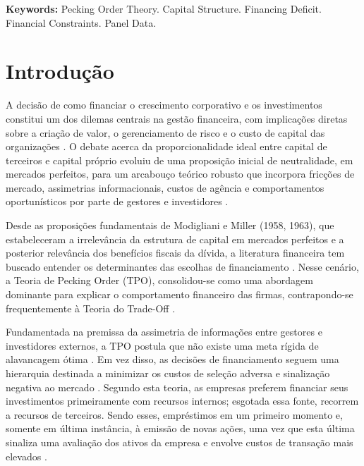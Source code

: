 \documentclass[a4paper,12pt]{article}
\begin{document}
\vspace{0.8cm}
\noindent
\textbf{Keywords:} Pecking Order Theory. Capital Structure. Financing Deficit. Financial Constraints. Panel Data.

\newpage
\tableofcontents

\newpage
\section{Introdução}

A decisão de como financiar o crescimento corporativo e os investimentos constitui um dos dilemas centrais na gestão financeira, com implicações diretas sobre a criação de valor, o gerenciamento de risco e o custo de capital das organizações \cite{AssafNeto2014,Damodaran2014}. O debate acerca da proporcionalidade ideal entre capital de terceiros e capital próprio evoluiu de uma proposição inicial de neutralidade, em mercados perfeitos, para um arcabouço teórico robusto que incorpora fricções de mercado, assimetrias informacionais, custos de agência e comportamentos oportunísticos por parte de gestores e investidores \cite{david2007}.

Desde as proposições fundamentais de Modigliani e Miller (1958, 1963), que estabeleceram a irrelevância da estrutura de capital em mercados perfeitos e a posterior relevância dos benefícios fiscais da dívida, a literatura financeira tem buscado entender os determinantes das escolhas de financiamento \cite{Agyei2020,Souza2024}. Nesse cenário, a Teoria de Pecking Order (TPO), consolidou-se como uma abordagem dominante para explicar o comportamento financeiro das firmas, contrapondo-se frequentemente à Teoria do Trade-Off \cite{Gitman2015,Yildirim2021}.

Fundamentada na premissa da assimetria de informações entre gestores e investidores externos, a TPO postula que não existe uma meta rígida de alavancagem ótima \cite{BerkDeMarzo2017,Singh2025}. Em vez disso, as decisões de financiamento seguem uma hierarquia destinada a minimizar os custos de seleção adversa e sinalização negativa ao mercado \cite{Gitman2015,Souza2024}. Segundo esta teoria, as empresas preferem financiar seus investimentos primeiramente com recursos internos; esgotada essa fonte, recorrem a recursos de terceiros. Sendo esses, empréstimos em um primeiro momento e, somente em última instância, à emissão de novas ações, uma vez que esta última sinaliza uma avaliação dos ativos da empresa e envolve custos de transação mais elevados \cite{Damodaran2014}.
\end{document}
